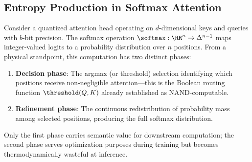 \subsection{Entropy Production in Softmax Attention}













Consider a quantized attention head operating on $d$-dimensional keys and queries with $b$-bit precision. The softmax operation $\softmax : \RR^n \to \Delta^{n-1}$ maps integer-valued logits to a probability distribution over $n$ positions. From a physical standpoint, this computation has two distinct phases:













\begin{enumerate}






    \item \textbf{Decision phase}: The argmax (or threshold) selection identifying which positions receive non-negligible attention—this is the Boolean routing function $\threshold(Q,K)$ already established as NAND-computable.






    \item \textbf{Refinement phase}: The continuous redistribution of probability mass among selected positions, producing the full softmax distribution.






\end{enumerate}













Only the first phase carries semantic value for downstream computation; the second phase serves optimization purposes during training but becomes thermodynamically wasteful at inference.













